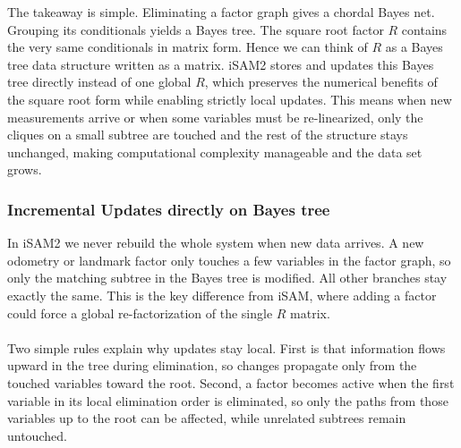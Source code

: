 \noindent
The takeaway is simple. Eliminating a factor graph gives a chordal Bayes net. Grouping its conditionals yields a Bayes tree. The square root factor $R$ contains the very same conditionals in matrix form. Hence we can think of $R$ as a Bayes tree data structure written as a matrix. iSAM2 stores and updates this Bayes tree directly instead of one global $R$, which preserves the numerical benefits of the square root form while enabling strictly local updates. This means when new measurements arrive or when some variables must be re-linearized, only the cliques on a small subtree are touched and the rest of the structure stays unchanged, making computational complexity manageable and the data set grows.



\subsubsection{Incremental Updates directly on Bayes tree}
In iSAM2 we never rebuild the whole system when new data arrives. A new odometry or landmark factor only touches a few variables in the factor graph, so only the matching subtree in the Bayes tree is modified. All other branches stay exactly the same. This is the key difference from iSAM, where adding a factor could force a global re-factorization of the single $R$ matrix.
\\ \\
Two simple rules explain why updates stay local. First is that information flows upward in the tree during elimination, so changes propagate only from the touched variables toward the root. Second, a factor becomes active when the first variable in its local elimination order is eliminated, so only the paths from those variables up to the root can be affected, while unrelated subtrees remain untouched.
\\ \\
